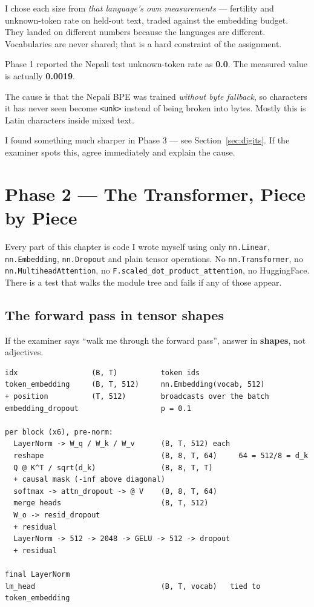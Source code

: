 \documentclass[11pt]{report}
\newcommand{\p}[1]{\texttt{#1}}
\begin{document}
I chose each size from \emph{that language's own measurements} --- fertility and
unknown-token rate on held-out text, traded against the embedding budget. They
landed on different numbers because the languages are different. Vocabularies
are never shared; that is a hard constraint of the assignment.

\begin{warnbox}
Phase 1 reported the Nepali test unknown-token rate as \textbf{0.0}. The
measured value is actually \textbf{0.0019}.

The cause is that the Nepali BPE was trained \emph{without byte fallback}, so
characters it has never seen become \p{<unk>} instead of being broken into
bytes. Mostly this is Latin characters inside mixed text.

I found something much sharper in Phase 3 --- see Section~\ref{sec:digits}.
If the examiner spots this, agree immediately and explain the cause.
\end{warnbox}

\chapter{Phase 2 --- The Transformer, Piece by Piece}

Every part of this chapter is code I wrote myself using only \p{nn.Linear},
\p{nn.Embedding}, \p{nn.Dropout} and plain tensor operations. No
\p{nn.Transformer}, no \p{nn.MultiheadAttention}, no
\p{F.scaled\_dot\_product\_attention}, no HuggingFace. There is a test that
walks the module tree and fails if any of those appear.

\section{The forward pass in tensor shapes}

If the examiner says ``walk me through the forward pass'', answer in
\textbf{shapes}, not adjectives.

\begin{lstlisting}
idx                 (B, T)          token ids
token_embedding     (B, T, 512)     nn.Embedding(vocab, 512)
+ position          (T, 512)        broadcasts over the batch
embedding_dropout                   p = 0.1

per block (x6), pre-norm:
  LayerNorm -> W_q / W_k / W_v      (B, T, 512) each
  reshape                           (B, 8, T, 64)     64 = 512/8 = d_k
  Q @ K^T / sqrt(d_k)               (B, 8, T, T)
  + causal mask (-inf above diagonal)
  softmax -> attn_dropout -> @ V    (B, 8, T, 64)
  merge heads                       (B, T, 512)
  W_o -> resid_dropout
  + residual
  LayerNorm -> 512 -> 2048 -> GELU -> 512 -> dropout
  + residual

final LayerNorm
lm_head                             (B, T, vocab)   tied to token_embedding
\end{lstlisting}
\end{document}
